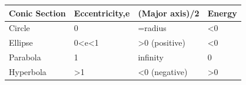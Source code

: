 \begin{table}[h]
\begin{tabular}{|l|l|l|l|}
\hline
\textbf{Conic Section} & \textbf{Eccentricity,e}   & \textbf{(Major axis)/2}    & \textbf{Energy} \\ \hline
Circle                 & 0                         & =radius                    & \textless{}0    \\ \hline
Ellipse                & 0\textless{}e\textless{}1 & \textgreater{}0 (positive) & \textless{}0    \\ \hline
Parabola               & 1                         & infinity                   & 0               \\ \hline
Hyperbola              & \textgreater{}1           & \textless{}0 (negative)    & \textgreater{}0 \\ \hline
\end{tabular}
\end{table}

